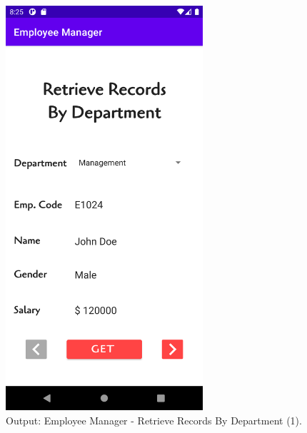 \documentclass[12pt, a4]{article}
\begin{document}
\subsection*{}
\begin{figure}[h]
\centering
\caption{Output: Employee Manager - Retrieve Records By Department (1).}
\includegraphics[height=15cm, width=7.3cm]{EmployeeManager/Screenshots/Output-7.png}
\end{figure}

\newpage
\end{document}
